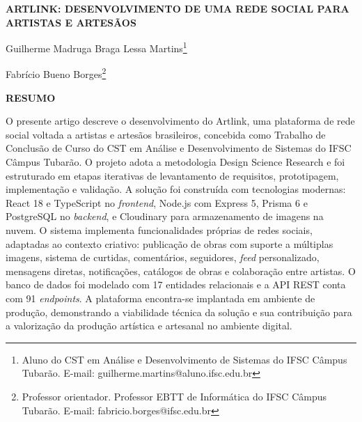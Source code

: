 \documentclass[a4paper, 12pt, oneside]{article}
\newcommand{\titulo}{ARTLINK: DESENVOLVIMENTO DE UMA REDE SOCIAL PARA ARTISTAS E ARTESÃOS}
\newcommand{\autor}{Guilherme Madruga Braga Lessa Martins}
\newcommand{\orientador}{Fabrício Bueno Borges}
\begin{document}
\thispagestyle{firstpage} %

\singlespacing %
\justifying %

\newcommand{\citacao}[1]{%
  \begin{list}{}{\setlength{\leftmargin}{4cm}} %
  \item \small #1
  \end{list}
}


\vspace*{0.5cm} %
\begin{center} %
\textbf{\MakeUppercase{\titulo}}
\end{center} %


\begin{flushright} %

\autor\footnote[*]{Aluno do CST em Análise e Desenvolvimento de Sistemas do IFSC Câmpus Tubarão. E-mail: guilherme.martins@aluno.ifsc.edu.br}

\orientador\footnote[**]{Professor orientador. Professor EBTT de Informática do IFSC Câmpus Tubarão. E-mail: fabricio.borges@ifsc.edu.br}

\end{flushright}


\begin{center}
\textbf{\MakeUppercase{Resumo}}
\end{center}

\noindent
O presente artigo descreve o desenvolvimento do Artlink, uma plataforma de rede social voltada a artistas e artesãos brasileiros, concebida como Trabalho de Conclusão de Curso do CST em Análise e Desenvolvimento de Sistemas do IFSC Câmpus Tubarão. O projeto adota a metodologia Design Science Research e foi estruturado em etapas iterativas de levantamento de requisitos, prototipagem, implementação e validação. A solução foi construída com tecnologias modernas: React 18 e TypeScript no \textit{frontend}, Node.js com Express 5, Prisma 6 e PostgreSQL no \textit{backend}, e Cloudinary para armazenamento de imagens na nuvem. O sistema implementa funcionalidades próprias de redes sociais, adaptadas ao contexto criativo: publicação de obras com suporte a múltiplas imagens, sistema de curtidas, comentários, seguidores, \textit{feed} personalizado, mensagens diretas, notificações, catálogos de obras e colaboração entre artistas. O banco de dados foi modelado com 17 entidades relacionais e a API REST conta com 91 \textit{endpoints}. A plataforma encontra-se implantada em ambiente de produção, demonstrando a viabilidade técnica da solução e sua contribuição para a valorização da produção artística e artesanal no ambiente digital.
\end{document}
